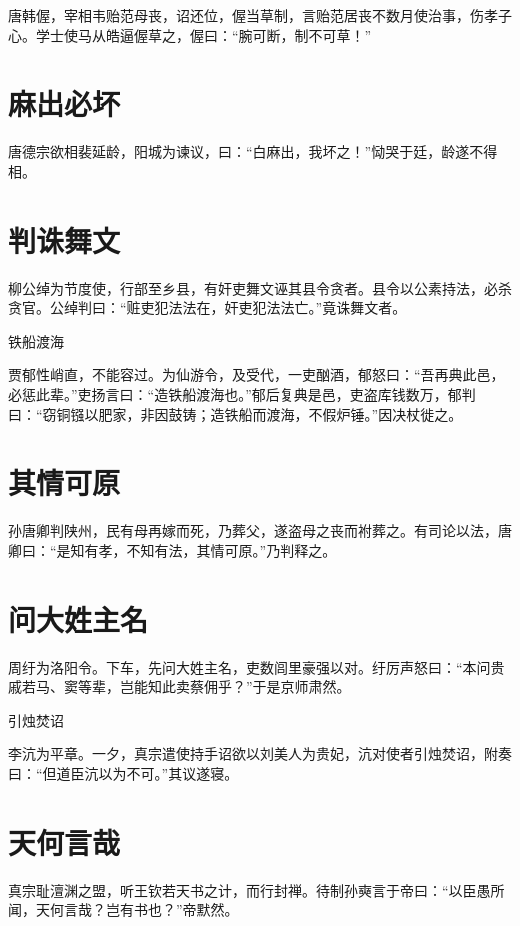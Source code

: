 \documentclass[a4paper,12pt,UTF8,twoside]{ctexbook}
\begin{document}
    唐韩偓，宰相韦贻范母丧，诏还位，偓当草制，言贻范居丧不数月使治事，伤孝子心。学士使马从皓逼偓草之，偓曰：“腕可断，制不可草！”
    
    \section{麻出必坏}
    
    唐德宗欲相裴延龄，阳城为谏议，曰：“白麻出，我坏之！”恸哭于廷，龄遂不得相。
    
    \section{判诛舞文}
    
    柳公绰为节度使，行部至乡县，有奸吏舞文诬其县令贪者。县令以公素持法，必杀贪官。公绰判曰：“赃吏犯法法在，奸吏犯法法亡。”竟诛舞文者。
    
    铁船渡海
    
    贾郁性峭直，不能容过。为仙游令，及受代，一吏酗酒，郁怒曰：“吾再典此邑，必惩此辈。”吏扬言曰：“造铁船渡海也。”郁后复典是邑，吏盗库钱数万，郁判曰：“窃铜镪以肥家，非因鼓铸；造铁船而渡海，不假炉锤。”因决杖徙之。
    
    \section{其情可原}
    
    孙唐卿判陕州，民有母再嫁而死，乃葬父，遂盗母之丧而袝葬之。有司论以法，唐卿曰：“是知有孝，不知有法，其情可原。”乃判释之。
    
    \section{问大姓主名}
    
    周纡为洛阳令。下车，先问大姓主名，吏数闾里豪强以对。纡厉声怒曰：“本问贵戚若马、窦等辈，岂能知此卖蔡佣乎？”于是京师肃然。
    
    引烛焚诏
    
    李沆为平章。一夕，真宗遣使持手诏欲以刘美人为贵妃，沆对使者引烛焚诏，附奏曰：“但道臣沆以为不可。”其议遂寝。
    
    \section{天何言哉}
    
    真宗耻澶渊之盟，听王钦若天书之计，而行封禅。待制孙奭言于帝曰：“以臣愚所闻，天何言哉？岂有书也？”帝默然。
    
\end{document}
